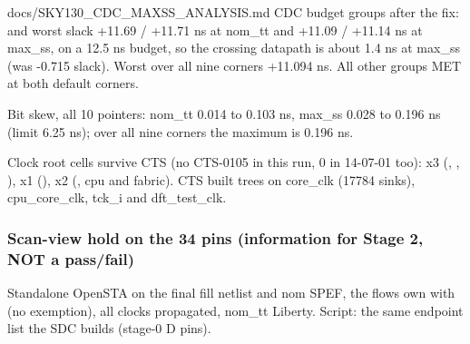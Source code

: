 \begin{relocated}{docs/SKY130_CDC_MAXSS_ANALYSIS.md}
CDC budget groups after the fix:  and 
worst slack +11.69 / +11.71 ns at nom\_tt and +11.09 / +11.14 ns at
max\_ss, on a 12.5 ns budget, so the crossing datapath is about 1.4 ns
at max\_ss (was -0.715 slack). Worst over all nine corners +11.094 ns.
All other groups MET at both default corners.

Bit skew, all 10 pointers: nom\_tt 0.014 to 0.103 ns, max\_ss 0.028 to
0.196 ns (limit 6.25 ns); over all nine corners the maximum is 0.196 ns.

Clock root cells survive CTS (no CTS-0105 in this run, 0 in 14-07-01
too):  x3 (,
,
),  x1
(),  x2 (,
cpu and fabric). CTS built trees on core\_clk (17784 sinks),
cpu\_\allowbreak{}core\_\allowbreak{}clk, tck\_i and
dft\_\allowbreak{}test\_\allowbreak{}clk.

\subsubsection{\texorpdfstring{Scan-view hold on the 34 pins
(information for Stage 2, NOT a
pass/\allowbreak{}fail)}{Scan-view hold on the 34 pins (information for Stage 2, NOT a pass/fail)}}\label{tm:pd:sky130-cdc-maxss:scan-view-hold-on-the-34-pins-information-for-stage-2-not-a-passfail}

Standalone OpenSTA on the final fill netlist and nom SPEF, the
flow\textquotesingle s own  with
 (no exemption), all clocks propagated,
nom\_tt Liberty. Script: the same endpoint list the SDC builds (stage-0
 D pins).


\end{relocated}
